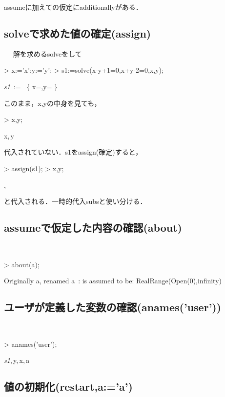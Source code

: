 assumeに加えての仮定にadditionallyがある．

\subsection{solveで求めた値の確定(assign)}　
解を求めるsolveをして
\begin{MapleInput}
> x:='x':y:='y': 
> s1:=solve({x-y+1=0,x+y-2=0},{x,y}); 
\end{MapleInput}
\begin{MapleOutput}
{\it s1}\, := \, \left\{ x=,y= \right\}
\end{MapleOutput}
このまま，x,yの中身を見ても，
\begin{MapleInput}
> x,y;
\end{MapleInput}
\begin{MapleOutput}
x,\,y
\end{MapleOutput}
代入されていない．s1をassign(確定)すると，
\begin{MapleInput}
> assign(s1);
> x,y;
\end{MapleInput}
\begin{MapleOutput}
,
\end{MapleOutput}
と代入される．一時的代入subsと使い分ける．

\subsection{assumeで仮定した内容の確認(about)}　
\begin{MapleInput}
> about(a);
\end{MapleInput}
\begin{MapleError}
Originally a, renamed a~:
  is assumed to be: RealRange(Open(0),infinity)
\end{MapleError}

\subsection{ユーザが定義した変数の確認(anames('user'))}　
\begin{MapleInput}
> anames('user');
\end{MapleInput}
\begin{MapleOutput}
{\it s1},\,y,\,x,\,a
\end{MapleOutput}

\subsection{値の初期化(restart,a:='a')}　
